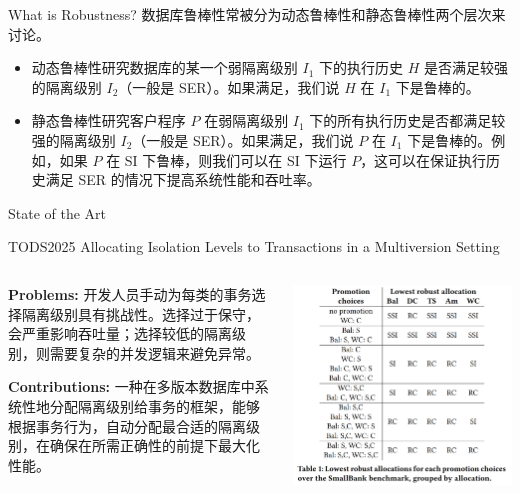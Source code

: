 
\begin{frame}{What is Robustness?}
	数据库鲁棒性常被分为动态鲁棒性和静态鲁棒性两个层次来讨论。

	\begin{itemize}
		\item 动态鲁棒性研究数据库的某一个弱隔离级别 $I_1$ 下的执行历史 $H$ 是否满足较强的隔离级别 $I_2$（一般是 SER）。如果满足，我们说 $H$ 在 $I_1$ 下是鲁棒的。
		\item 静态鲁棒性研究客户程序 $P$ 在弱隔离级别 $I_1$ 下的所有执行历史是否都满足较强的隔离级别 $I_2$（一般是 SER）。如果满足，我们说 $P$ 在 $I_1$ 下是鲁棒的。例如，如果 $P$ 在 SI 下鲁棒，则我们可以在 SI 下运行 $P$，这可以在保证执行历史满足 SER 的情况下提高系统性能和吞吐率。
	\end{itemize}
\end{frame}

\begin{frame}{State of the Art}
	
\end{frame}

\begin{frame}{TODS2025 Allocating Isolation Levels to Transactions in a Multiversion Setting}
	\begin{columns}
		\begin{column}{0.5\textwidth}
			\textbf{Problems: }开发人员手动为每类的事务选择隔离级别具有挑战性。选择过于保守，会严重影响吞吐量；选择较低的隔离级别，则需要复杂的并发逻辑来避免异常。

			\textbf{Contributions: }一种在多版本数据库中系统性地分配隔离级别给事务的框架，能够根据事务行为，自动分配最合适的隔离级别，在确保在所需正确性的前提下最大化性能。
		\end{column}
		\begin{column}{0.5\textwidth}
			\includegraphics[width=0.98\linewidth]{figs/lowest-robust-allocations}
		\end{column}
	\end{columns}
\end{frame}

